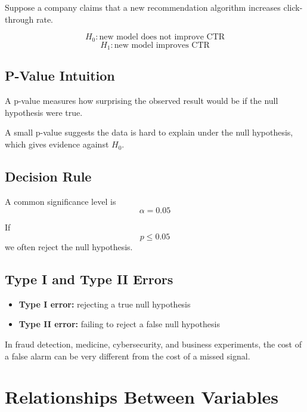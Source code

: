 \documentclass[11pt,a4paper]{article}
\begin{document}
\begin{examplebox}
Suppose a company claims that a new recommendation algorithm increases click-through rate.

\[
H_0: \text{new model does not improve CTR}
\]
\[
H_1: \text{new model improves CTR}
\]
\end{examplebox}

\subsection{P-Value Intuition}

A p-value measures how surprising the observed result would be if the null hypothesis were true.

\begin{conceptbox}[Interpretation]
A small p-value suggests the data is hard to explain under the null hypothesis, which gives evidence against $H_0$.
\end{conceptbox}

\subsection{Decision Rule}

A common significance level is
\[
\alpha = 0.05
\]

If
\[
p \leq 0.05
\]
we often reject the null hypothesis.

\subsection{Type I and Type II Errors}

\begin{itemize}[leftmargin=*]
  \item \textbf{Type I error:} rejecting a true null hypothesis
  \item \textbf{Type II error:} failing to reject a false null hypothesis
\end{itemize}

\begin{alertbox}
In fraud detection, medicine, cybersecurity, and business experiments, the cost of a false alarm can be very different from the cost of a missed signal.
\end{alertbox}

\section{Relationships Between Variables}
\end{document}
